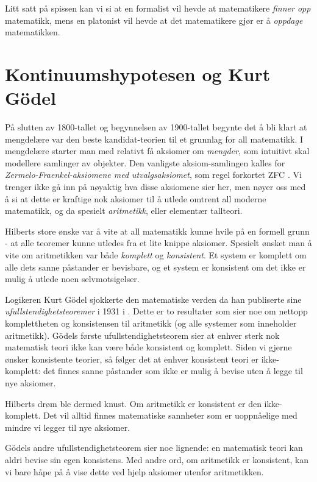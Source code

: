 \documentclass[12pt, norsk]{article}
\begin{document}
Litt satt på spissen kan vi si at en formalist vil hevde at matematikere \emph{finner opp} matematikk, mens en platonist vil hevde at det matematikere gjør er å \emph{oppdage} matematikken.

\section{Kontinuumshypotesen og Kurt Gödel}

På slutten av 1800-tallet og begynnelsen av 1900-tallet begynte det å bli klart at mengdelære var den beste kandidat-teorien til et grunnlag for all matematikk. I mengdelære starter man med relativt få aksiomer om \emph{mengder}, som intuitivt skal modellere samlinger av objekter. Den vanligste aksiom-samlingen kalles for \emph{Zermelo-Fraenkel-aksiomene med utvalgsaksiomet}, som regel forkortet ZFC \cite{wiki_zfc}. Vi trenger ikke gå inn på nøyaktig hva disse aksiomene sier her, men nøyer oss med å si at dette er kraftige nok aksiomer til å utlede omtrent all moderne matematikk, og da spesielt \emph{aritmetikk}, eller elementær tallteori.

Hilberts store ønske var å vite at all matematikk kunne hvile på en formell grunn - at alle teoremer kunne utledes fra et lite knippe aksiomer. Spesielt ønsket man å vite om aritmetikken var både \emph{komplett} og \emph{konsistent}. Et system er komplett om alle dets sanne påstander er bevisbare, og et system er konsistent om det ikke er mulig å utlede noen selvmotsigelser. 

Logikeren Kurt Gödel sjokkerte den matematiske verden da han publiserte sine \emph{ufullstendighetsteoremer} i 1931 i \cite{godel_formal}. Dette er to resultater som sier noe om nettopp komplettheten og konsistensen til aritmetikk (og alle systemer som inneholder aritmetikk). Gödels første ufullstendighetsteorem sier at enhver sterk nok matematisk teori ikke kan være både konsistent og komplett. Siden vi gjerne ønsker konsistente teorier, så følger det at enhver konsistent teori er ikke-komplett: det finnes sanne påstander som ikke er mulig å bevise uten å legge til nye aksiomer. 

Hilberts drøm ble dermed knust. Om aritmetikk er konsistent er den ikke-komplett. Det vil alltid finnes matematiske sannheter som er uoppnåelige med mindre vi legger til nye aksiomer.

Gödels andre ufullstendighetsteorem sier noe lignende: en matematisk teori kan aldri bevise sin egen konsistens. Med andre ord, om aritmetikk er konsistent, kan vi bare håpe på å vise dette ved hjelp aksiomer utenfor aritmetikken.
\end{document}
